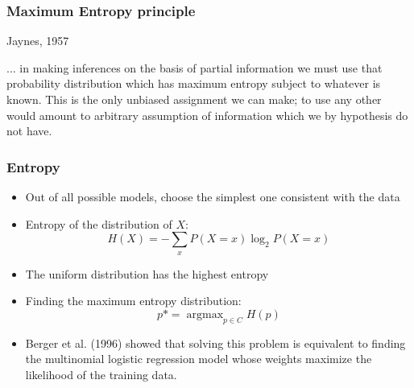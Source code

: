 \documentclass[14pt,mathserif,dvipsnames,usenames]{beamer}
\DeclareMathOperator*{\argmax}{argmax}
\begin{document}
\begin{frame}\frametitle{Maximum Entropy principle}
 \begin{block}{Jaynes, 1957}
   \begin{small}
     ... in making inferences on the basis of partial information we
     must use that probability distribution which has \alert{maximum
       entropy} subject to whatever is known. This is the only
     \alert{unbiased} assignment we can make; to use any other would amount to
     arbitrary assumption of information which we by hypothesis do not
     have.
   \end{small}
 \end{block}
\end{frame}


\begin{frame}
 \frametitle{Entropy}
\begin{itemize}
\item Out of all possible models, choose the simplest one consistent
  with the data
 \item Entropy of the distribution of $X$:
\[ H(X) = -\sum_{x}P(X=x)\log_2P(X=x) \] 
\item The uniform distribution has the \alert{highest entropy}
\end{itemize}
\end{frame}

\begin{frame}
\begin{itemize}
\item Finding the maximum entropy distribution:
\[
 p* = \argmax_{p\in C} H(p)
\]
\item Berger et al. (1996) showed that solving this problem is
  equivalent to finding the multinomial logistic regression model
  whose weights maximize the likelihood of the training data.
\end{itemize}
\end{frame}
\end{document}
